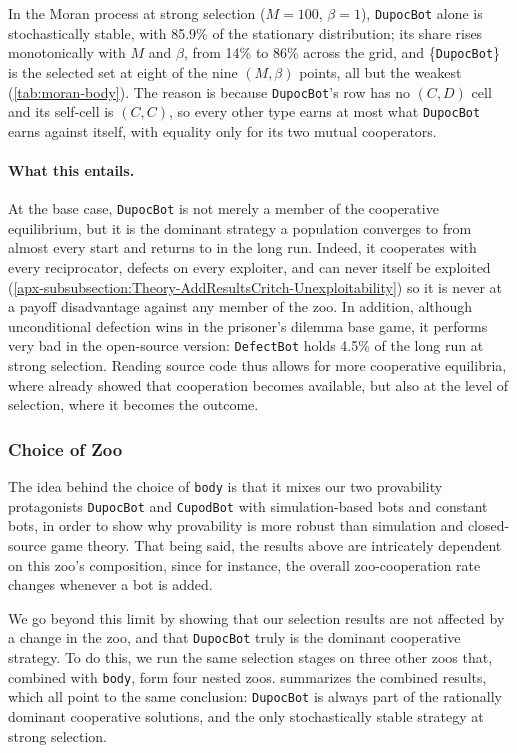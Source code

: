 \documentclass[twoside,11pt]{article}
\begin{document}


In the Moran process at strong selection ($M = 100$, $\beta = 1$), \texttt{DupocBot} alone is stochastically stable, with 85.9\% of the stationary distribution; its share rises monotonically with $M$ and $\beta$, from 14\% to 86\% across the grid, and \{\texttt{DupocBot}\} is the selected set at eight of the nine $(M,\beta)$ points, all but the weakest (\cref{tab:moran-body}). The reason is because \texttt{DupocBot}'s row has no $(C,D)$ cell and its self-cell is $(C,C)$, so every other type earns at most what \texttt{DupocBot} earns against itself, with equality only for its two mutual cooperators.

\paragraph{What this entails.} At the base case, \texttt{DupocBot} is not merely a member of the cooperative equilibrium, but it is the dominant strategy a population converges to from almost every start and returns to in the long run. Indeed, it cooperates with every reciprocator, defects on every exploiter, and can never itself be exploited (\cref{apx-subsubsection:Theory-AddResultsCritch-Unexploitability}) so it is never at a payoff disadvantage against any member of the zoo. In addition, although unconditional defection wins in the prisoner's dilemma base game, it performs very bad in the open-source version: \texttt{DefectBot} holds 4.5\% of the long run at strong selection. Reading source code thus allows for more cooperative equilibria, where \citet{Critch} already showed that cooperation becomes available, but also at the level of selection, where it becomes the outcome.


\subsubsection{Choice of Zoo}
\label{subsubsection:Results-Base-Zoo}
The idea behind the choice of \texttt{body} is that it mixes our two provability protagonists \texttt{DupocBot} and \texttt{CupodBot} with simulation-based bots and constant bots, in order to show why provability is more robust than simulation and closed-source game theory. That being said, the results above are intricately dependent on this zoo's composition, since for instance, the overall zoo-cooperation rate changes whenever a bot is added. 

We go beyond this limit by showing that our selection results are not affected by a change in the zoo, and that \texttt{DupocBot} truly is the dominant cooperative strategy. To do this, we run the same selection stages on three other zoos that, combined with \texttt{body}, form four nested zoos.  summarizes the combined results, which all point to the same conclusion: \texttt{DupocBot} is always part of the rationally dominant cooperative solutions, and the only stochastically stable strategy at strong selection.
\end{document}
